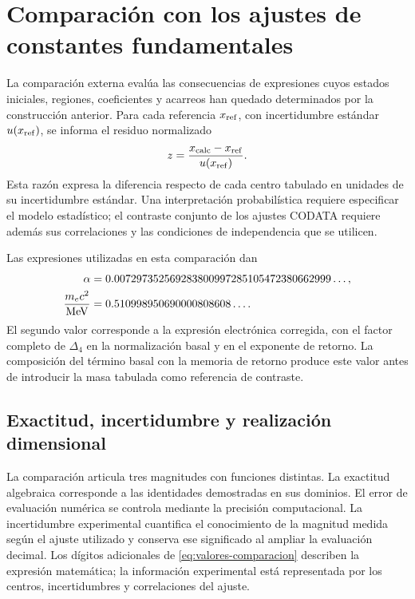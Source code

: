 \section{Comparación con los ajustes de constantes fundamentales}
\label{sec:comparacion}

La comparación externa evalúa las consecuencias de expresiones cuyos estados iniciales, regiones, coeficientes y acarreos han quedado determinados por la construcción anterior. Para cada referencia \(x_{\rm ref}\), con incertidumbre estándar \(u(x_{\rm ref})\), se informa el residuo normalizado
\[
 z=\frac{x_{\rm calc}-x_{\rm ref}}{u(x_{\rm ref})}.
\]
Esta razón expresa la diferencia respecto de cada centro tabulado en unidades de su incertidumbre estándar. Una interpretación probabilística requiere especificar el modelo estadístico; el contraste conjunto de los ajustes CODATA requiere además sus correlaciones y las condiciones de independencia que se utilicen.

Las expresiones utilizadas en esta comparación dan
\begin{align}
 \alpha&=0.007297352569283800997285105472380662999\ldots,\notag\\
 \frac{m_ec^2}{\mathrm{MeV}}&=0.510998950690000808608\ldots.
 \label{eq:valores-comparacion}
\end{align}
El segundo valor corresponde a la expresión electrónica corregida, con el factor completo de \(\Delta_4\) en la normalización basal y en el exponente de retorno. La composición del término basal con la memoria de retorno produce este valor antes de introducir la masa tabulada como referencia de contraste.

\subsection{Exactitud, incertidumbre y realización dimensional}

La comparación articula tres magnitudes con funciones distintas. La exactitud algebraica corresponde a las identidades demostradas en sus dominios. El error de evaluación numérica se controla mediante la precisión computacional. La incertidumbre experimental cuantifica el conocimiento de la magnitud medida según el ajuste utilizado y conserva ese significado al ampliar la evaluación decimal. Los dígitos adicionales de \eqref{eq:valores-comparacion} describen la expresión matemática; la información experimental está representada por los centros, incertidumbres y correlaciones del ajuste.

